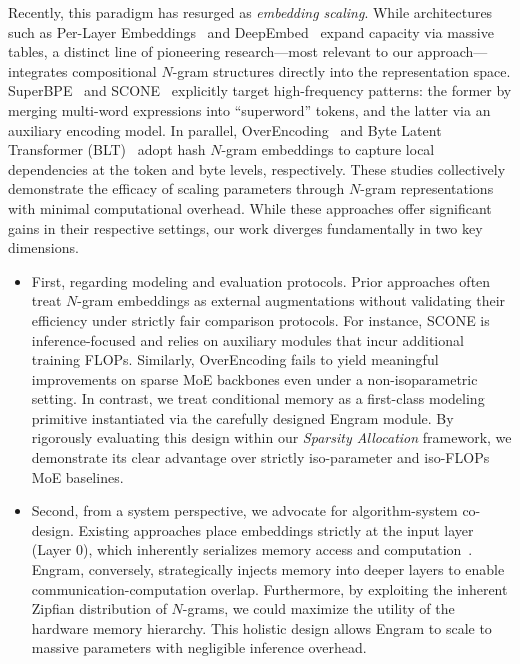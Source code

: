 Recently, this paradigm has resurged as \textit{embedding scaling}. While architectures such as Per-Layer Embeddings~\citep{gemma_3n_2025} and DeepEmbed~\citep{rwkv_deepembed_wiki_2025} expand capacity via massive tables, a distinct line of pioneering research—most relevant to our approach—integrates compositional $N$-gram structures directly into the representation space. 
SuperBPE~\citep{liu2025superbpe} and SCONE~\citep{yu2025scaling} explicitly target high-frequency patterns: the former by merging multi-word expressions into ``superword'' tokens, and the latter via an auxiliary encoding model. 
In parallel, OverEncoding~\citep{huang2025over} and Byte Latent Transformer (BLT)~\citep{pagnoni2025byte} adopt hash $N$-gram embeddings to capture local dependencies at the token and byte levels, respectively. These studies collectively demonstrate the efficacy of scaling parameters through $N$-gram representations with minimal computational overhead. While these approaches offer significant gains in their respective settings, our work diverges fundamentally in two key dimensions. 
\begin{itemize}
    \item First, regarding modeling and evaluation protocols. Prior approaches often treat $N$-gram embeddings as external augmentations without validating their efficiency under strictly fair comparison protocols. For instance, SCONE \citep{yu2025scaling} is inference-focused and relies on auxiliary modules that incur additional training FLOPs. Similarly, OverEncoding \citep{huang2025over} fails to yield meaningful improvements on sparse MoE backbones even under a non-isoparametric setting. In contrast, we treat conditional memory as a first-class modeling primitive instantiated via the carefully designed Engram module. By rigorously evaluating this design within our \textit{Sparsity Allocation} framework, we demonstrate its clear advantage over strictly iso-parameter and iso-FLOPs MoE baselines.
    \item  Second, from a system perspective, we advocate for algorithm-system co-design. Existing approaches place embeddings strictly at the input layer (Layer 0), which inherently serializes memory access and computation~\citep{yu2025scaling,huang2025over}. Engram, conversely, strategically injects memory into deeper layers to enable communication-computation overlap. Furthermore, by exploiting the inherent Zipfian distribution of $N$-grams, we could maximize the utility of the hardware memory hierarchy. This holistic design allows Engram to scale to massive parameters with negligible inference overhead.
\end{itemize}
 

